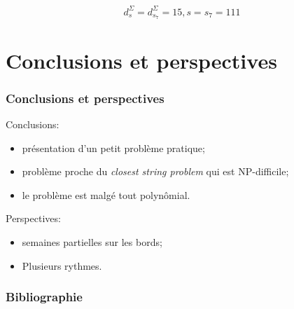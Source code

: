 \documentclass[table]{beamer}
\newcommand{\+}{\cellcolor[gray]{1}\bfseries}
\newcommand{\<}{\cellcolor[gray]{0.8}\rmfamily\itshape}
\newcommand*{\foreign}[2][english]{%
    \emph{\foreignlanguage{#1}{#2}}%
}
\begin{document}
\begin{frame}
  \begin{displaymath}
    d^\Sigma_s = d^\Sigma_{s_7} = 15, s = s_7 = 111
  \end{displaymath}
\end{frame}

\section{Conclusions et perspectives}

\begin{frame}
  \frametitle{Conclusions et perspectives}

  Conclusions:
  \begin{itemize}
  \item présentation d'un petit problème pratique;
  \item problème proche du \foreign{closest string problem} qui est
    NP-difficile;
  \item le problème est malgé tout polynômial.
  \end{itemize}\pause

  Perspectives:
  \begin{itemize}
  \item semaines partielles sur les bords;
  \item Plusieurs rythmes.
  \end{itemize}
\end{frame}

\begin{frame}
  \titlepage
\end{frame}

\appendix

\begin{frame}[allowframebreaks]
  \frametitle{Bibliographie}
  
  
\end{frame}
\end{document}
